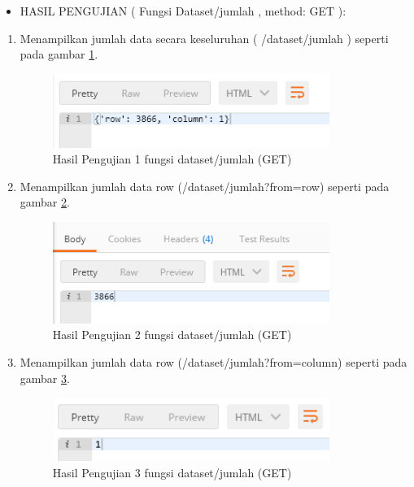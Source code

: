 \begin{itemize}
\item HASIL PENGUJIAN ( Fungsi Dataset/jumlah , method: GET ):
\end{itemize}
\begin{enumerate}
\item Menampilkan jumlah data secara keseluruhan ( /dataset/jumlah ) seperti pada gambar \ref{fig:hujifdj1}.
\begin{figure}[!htbp]
	\centerline{\includegraphics[width=0.85\textwidth]{figures/10/hujifdj1.PNG}}
	\caption{Hasil Pengujian 1 fungsi dataset/jumlah (GET)}
	\label{fig:hujifdj1}
\end{figure}

\item Menampilkan jumlah data row (/dataset/jumlah?from=row) seperti pada gambar \ref{fig:hujifdj2}.
\begin{figure}[!htbp]
	\centerline{\includegraphics[width=0.85\textwidth]{figures/10/hujifdj2.PNG}}
	\caption{Hasil Pengujian 2 fungsi dataset/jumlah (GET)}
	\label{fig:hujifdj2}
\end{figure}

\item  Menampilkan jumlah data row (/dataset/jumlah?from=column) seperti pada gambar \ref{fig:hujifdj3}.
\begin{figure}[!htbp]
	\centerline{\includegraphics[width=0.85\textwidth]{figures/10/hujifdj3.PNG}}
	\caption{Hasil Pengujian 3 fungsi dataset/jumlah (GET)}
	\label{fig:hujifdj3}
\end{figure}
\end{enumerate}

